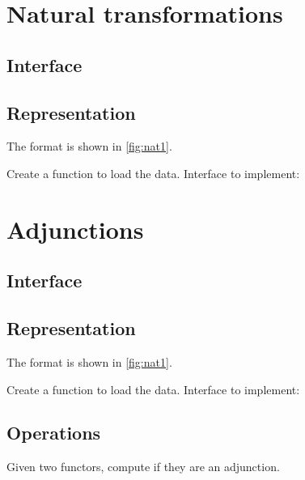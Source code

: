 \section{Natural transformations}

\subsection{Interface}

\subsection{Representation}
The format is shown in \cref{fig:nat1}.



\begin{exercise}
  Create a function to load the data.
  Interface to implement:
%
\end{exercise}


\section{Adjunctions}

\subsection{Interface}

\subsection{Representation}

The format is shown in \cref{fig:nat1}.



\begin{exercise}
  Create a function to load the data.
  Interface to implement:
%
\end{exercise}

\subsection{Operations}
\begin{exercise}
  Given two functors, compute if they are an adjunction.

\end{exercise}

